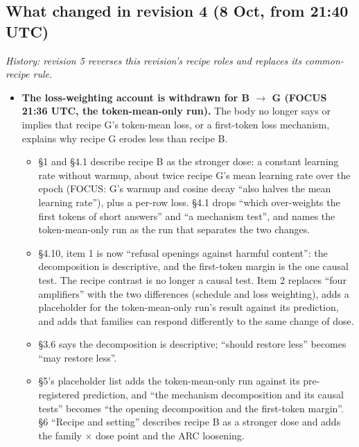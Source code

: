 \documentclass{article}
\theoremstyle{plain}
\theoremstyle{definition}
\theoremstyle{remark}
\begin{document}
\subsection{What changed in revision 4 (8 Oct, from 21:40 UTC)}

\emph{History: revision 5 reverses this revision's recipe roles and replaces its
common-recipe rule.}

\begin{itemize}
  \item \textbf{The loss-weighting account is withdrawn for B $\to$ G (FOCUS
        21:36 UTC, the token-mean-only run).} The body no longer says or implies
        that recipe G's token-mean loss, or a first-token loss mechanism,
        explains why recipe G erodes less than recipe B.
  \begin{itemize}
    \item \S{}1 and \S{}4.1 describe recipe B as the stronger dose: a constant
          learning rate without warmup, about twice recipe G's mean learning
          rate over the epoch (FOCUS: G's warmup and cosine decay ``also halves
          the mean learning rate''), plus a per-row loss. \S{}4.1 drops ``which
          over-weights the first tokens of short answers'' and ``a mechanism
          test'', and names the token-mean-only run as the run that separates
          the two changes.
    \item \S{}4.10, item 1 is now ``refusal openings against harmful content'':
          the decomposition is descriptive, and the first-token margin is the
          one causal test. The recipe contrast is no longer a causal test. Item
          2 replaces ``four amplifiers'' with the two differences (schedule and
          loss weighting), adds a placeholder for the token-mean-only run's
          result against its prediction, and adds that families can respond
          differently to the same change of dose.
    \item \S{}3.6 says the decomposition is descriptive; ``should restore less''
          becomes ``may restore less''.
    \item \S{}5's placeholder list adds the token-mean-only run against its
          pre-registered prediction, and ``the mechanism decomposition and its
          causal tests'' becomes ``the opening decomposition and the first-token
          margin''. \S{}6 ``Recipe and setting'' describes recipe B as a
          stronger dose and adds the family $\times$ dose point and the ARC
          loosening.
  \end{itemize}

\end{itemize}
\end{document}
